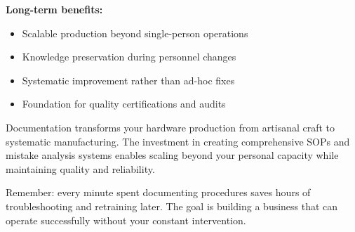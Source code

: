 \textbf{Long-term benefits:}
\begin{itemize}
\item Scalable production beyond single-person operations
\item Knowledge preservation during personnel changes
\item Systematic improvement rather than ad-hoc fixes
\item Foundation for quality certifications and audits
\end{itemize}

Documentation transforms your hardware production from artisanal craft to systematic manufacturing. The investment in creating comprehensive SOPs and mistake analysis systems enables scaling beyond your personal capacity while maintaining quality and reliability.

Remember: every minute spent documenting procedures saves hours of troubleshooting and retraining later. The goal is building a business that can operate successfully without your constant intervention.